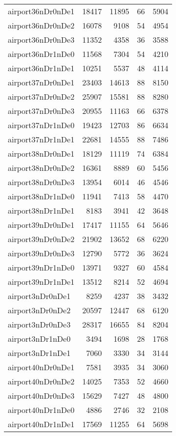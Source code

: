 \begin{longtable}{lrrrr}
airport36nDr0nDe1 & 18417 & 11895 & 66 & 5904 \\
airport36nDr0nDe2 & 16078 & 9108 & 54 & 4954 \\
airport36nDr0nDe3 & 11352 & 4358 & 36 & 3588 \\
airport36nDr1nDe0 & 11568 & 7304 & 54 & 4210 \\
airport36nDr1nDe1 & 10251 & 5537 & 48 & 4114 \\
airport37nDr0nDe1 & 23403 & 14613 & 88 & 8150 \\
airport37nDr0nDe2 & 25907 & 15581 & 88 & 8280 \\
airport37nDr0nDe3 & 20955 & 11163 & 66 & 6378 \\
airport37nDr1nDe0 & 19423 & 12703 & 86 & 6634 \\
airport37nDr1nDe1 & 22681 & 14555 & 88 & 7486 \\
airport38nDr0nDe1 & 18129 & 11119 & 74 & 6384 \\
airport38nDr0nDe2 & 16361 & 8889 & 60 & 5456 \\
airport38nDr0nDe3 & 13954 & 6014 & 46 & 4546 \\
airport38nDr1nDe0 & 11941 & 7413 & 58 & 4470 \\
airport38nDr1nDe1 & 8183 & 3941 & 42 & 3648 \\
airport39nDr0nDe1 & 17417 & 11155 & 64 & 5646 \\
airport39nDr0nDe2 & 21902 & 13652 & 68 & 6220 \\
airport39nDr0nDe3 & 12790 & 5772 & 36 & 3624 \\
airport39nDr1nDe0 & 13971 & 9327 & 60 & 4584 \\
airport39nDr1nDe1 & 13512 & 8214 & 52 & 4694 \\
airport3nDr0nDe1 & 8259 & 4237 & 38 & 3432 \\
airport3nDr0nDe2 & 20597 & 12447 & 68 & 6120 \\
airport3nDr0nDe3 & 28317 & 16655 & 84 & 8204 \\
airport3nDr1nDe0 & 3494 & 1698 & 28 & 1768 \\
airport3nDr1nDe1 & 7060 & 3330 & 34 & 3144 \\
airport40nDr0nDe1 & 7581 & 3935 & 34 & 3060 \\
airport40nDr0nDe2 & 14025 & 7353 & 52 & 4660 \\
airport40nDr0nDe3 & 15629 & 7427 & 48 & 4800 \\
airport40nDr1nDe0 & 4886 & 2746 & 32 & 2108 \\
airport40nDr1nDe1 & 17569 & 11255 & 64 & 5698 \\

\end{longtable}
